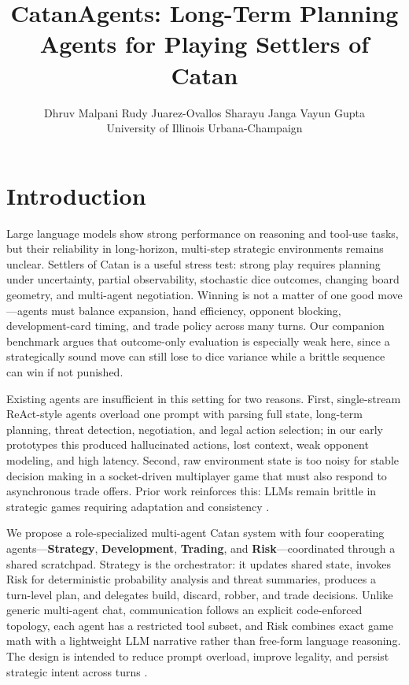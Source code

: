 \documentclass{article} %
\title{CatanAgents: Long-Term Planning Agents for Playing Settlers of Catan}
\author{
Dhruv Malpani \quad
Rudy Juarez-Ovallos \quad
Sharayu Janga \quad
Vayun Gupta \\
University of Illinois Urbana-Champaign \\
}
\begin{document}
\maketitle
\lhead{}
\thispagestyle{fancy}

\section{Introduction}

Large language models show strong performance on reasoning and tool-use tasks, but their reliability in long-horizon, multi-step strategic environments remains unclear. Settlers of Catan is a useful stress test: strong play requires planning under uncertainty, partial observability, stochastic dice outcomes, changing board geometry, and multi-agent negotiation. Winning is not a matter of one good move---agents must balance expansion, hand efficiency, opponent blocking, development-card timing, and trade policy across many turns. Our companion benchmark argues that outcome-only evaluation is especially weak here, since a strategically sound move can still lose to dice variance while a brittle sequence can win if not punished.

Existing agents are insufficient in this setting for two reasons. First, single-stream ReAct-style agents overload one prompt with parsing full state, long-term planning, threat detection, negotiation, and legal action selection; in our early prototypes this produced hallucinated actions, lost context, weak opponent modeling, and high latency. Second, raw environment state is too noisy for stable decision making in a socket-driven multiplayer game that must also respond to asynchronous trade offers. Prior work reinforces this: LLMs remain brittle in strategic games requiring adaptation and consistency \citep{yao2022react,vidler2025playing}.

We propose a role-specialized multi-agent Catan system with four cooperating agents---\textbf{Strategy}, \textbf{Development}, \textbf{Trading}, and \textbf{Risk}---coordinated through a shared scratchpad. Strategy is the orchestrator: it updates shared state, invokes Risk for deterministic probability analysis and threat summaries, produces a turn-level plan, and delegates build, discard, robber, and trade decisions. Unlike generic multi-agent chat, communication follows an explicit code-enforced topology, each agent has a restricted tool subset, and Risk combines exact game math with a lightweight LLM narrative rather than free-form language reasoning. The design is intended to reduce prompt overload, improve legality, and persist strategic intent across turns \citep{belle2025agentsofchange}.
\end{document}
